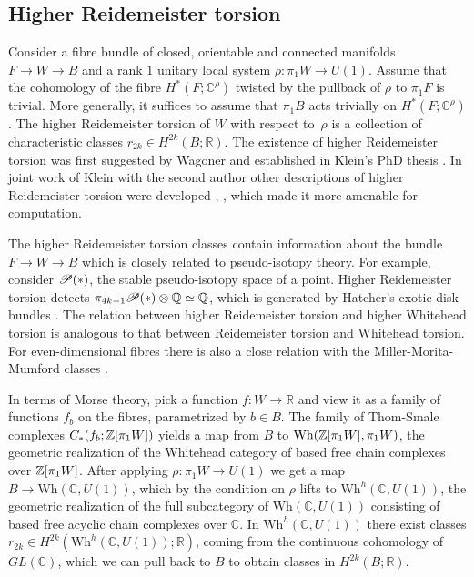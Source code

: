 \documentclass[11pt]{article}
\numberwithin{equation}{section}\providecommand{\dpl}{\displaystyle}
\newcommand{\Wh}{\mathrm{Wh}}
\theoremstyle{plain}
\theoremstyle{definition}
\newcommand{\bC}{\mathbb{C}}\newcommand{\bD}{\mathbb{D}}
\newcommand{\bQ}{\mathbb{Q}}\newcommand{\bR}{\mathbb{R}}
\begin{document}
\subsection{Higher Reidemeister torsion}
Consider a fibre bundle of closed, orientable and connected manifolds $F \to W \to B$ and a rank $1$ unitary local system \hbox{$\rho : \pi_1W \to U(1)$}. Assume that the cohomology of the fibre $H^*(F;\bC^\rho)$ twisted by the pullback of $\rho$ to $\pi_1F$ is trivial. More generally, it suffices to assume that $\pi_1B$ acts trivially on $H^*(F;\bC^\rho)$. The higher Reidemeister torsion of $W$ with respect to~$\rho$ is a collection of characteristic classes $r_{2k} \in H^{2k}(B;\bR)$. The existence of higher Reidemeister torsion was first suggested by Wagoner \cite{W76} and established in Klein's PhD thesis \cite{K89}. In joint work of Klein with the second author other descriptions of higher Reidemeister torsion were developed \cite{IK93a}, \cite{IK93}, which made it more amenable for computation.

The higher Reidemeister torsion classes contain information about the bundle \hbox{$F \to W\to B$} which is closely related to pseudo-isotopy theory. For example, consider $\mathscr{P}(\ast)$, the stable pseudo-isotopy space of a point. Higher Reidemeister torsion detects $\pi_{4k-1}\cP( \ast) \otimes \bQ \simeq \bQ$, which is generated by Hatcher's exotic disk bundles \cite{I02}. The relation between higher Reidemeister torsion and higher Whitehead torsion is analogous to that between Reidemeister torsion and Whitehead torsion. For even-dimensional fibres there is also a close relation with the Miller-Morita-Mumford classes \cite{I04}.

In terms of Morse theory, pick a function $f:W \to \bR$ and view it as a family of functions $f_b$ on the fibres, parametrized by $b \in B$. The family of Thom-Smale complexes $C_*(f_b;\mathbb{Z}[\pi_1W])$ yields a map from $B$ to $\Wh(\bZ[\pi_1W],\pi_1W)$, the geometric realization of the Whitehead category of based free chain complexes over $\mathbb{Z}[\pi_1W]$. After applying $\rho:\pi_1 W \to U(1)$ we get a map $B \to \Wh(\bC,U(1))$, which by the condition on $\rho$ lifts to $\Wh^h(\bC,U(1))$, the geometric realization of the full subcategory of $\Wh(\bC,U(1))$ consisting of based free acyclic chain complexes over $\bC$. In $\Wh^h(\bC,U(1))$ there exist classes $r_{2k} \in H^{2k}(\Wh^h(\bC,U(1)); \bR)$, coming from the continuous cohomology of $GL(\bC)$, which we can pull back to $B$ to obtain classes in $H^{2k}(B; \bR)$.
\end{document}

